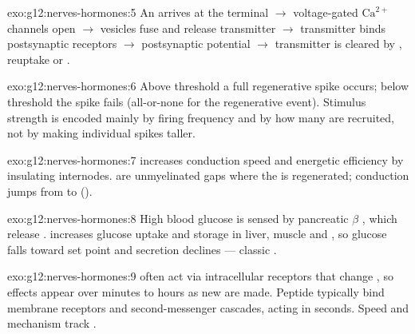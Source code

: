 \begin{solution}{exo:g12:nerves-hormones:5}
An  arrives at the terminal $\to$ voltage-gated
$\mathrm{Ca}^{2+}$ channels open $\to$ vesicles fuse and release transmitter
$\to$ transmitter binds postsynaptic receptors $\to$ postsynaptic potential
$\to$ transmitter is cleared by , reuptake or .
\end{solution}

\begin{solution}{exo:g12:nerves-hormones:6}
Above threshold a full regenerative spike occurs; below threshold the spike
fails (all-or-none for the regenerative event). Stimulus strength is encoded
mainly by firing frequency and by how many  are recruited, not by making
individual spikes taller.
\end{solution}

\begin{solution}{exo:g12:nerves-hormones:7}
 increases conduction speed and energetic efficiency by insulating
internodes.  are unmyelinated gaps where the 
is regenerated; conduction jumps from  to  ().
\end{solution}

\begin{solution}{exo:g12:nerves-hormones:8}
High blood glucose is sensed by pancreatic $\beta$ , which release
.  increases glucose uptake and storage in liver, muscle and ,
so glucose falls toward set point and  secretion declines --- classic
.
\end{solution}

\begin{solution}{exo:g12:nerves-hormones:9}
  often act via intracellular receptors that change 
, so effects appear over minutes to hours as new  are
made. Peptide  typically bind membrane receptors and second-messenger
cascades, acting in seconds. Speed and mechanism track  .
\end{solution}


